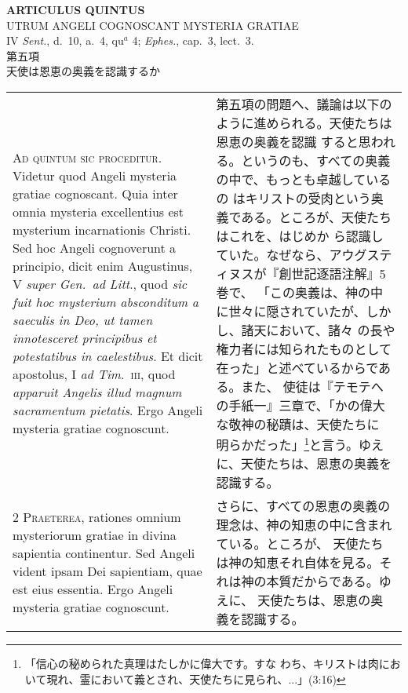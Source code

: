 \documentclass[10pt]{jsarticle} %
\begin{document}
\begin{center}
 {\Large {\bf ARTICULUS QUINTUS}}\\
 {\large UTRUM ANGELI COGNOSCANT MYSTERIA GRATIAE}\\
 {\footnotesize IV {\itshape Sent.}, d.~10, a.~4, qu$^a$ 4; {\itshape
 Ephes.}, cap.~3, lect.~3.}\\
 {\Large 第五項\\天使は恩恵の奥義を認識するか}
\end{center}

\begin{longtable}{p{21em}p{21em}}
{\huge A}{\scshape d quintum sic proceditur}. Videtur quod
Angeli mysteria gratiae cognoscant. Quia inter omnia mysteria
excellentius est mysterium incarnationis Christi. Sed hoc Angeli
cognoverunt a principio, dicit enim Augustinus, V {\itshape super Gen.~ad Litt}.,
quod {\itshape sic fuit hoc mysterium absconditum a saeculis in Deo, ut tamen
innotesceret principibus et potestatibus in caelestibus}. Et dicit
apostolus, I {\itshape ad Tim}.~{\scshape iii}, quod {\itshape apparuit Angelis illud magnum sacramentum
pietatis}. Ergo Angeli mysteria gratiae cognoscunt.

&

第五項の問題へ、議論は以下のように進められる。天使たちは恩恵の奥義を認識
 すると思われる。というのも、すべての奥義の中で、もっとも卓越しているの
 はキリストの受肉という奥義である。ところが、天使たちはこれを、はじめか
 ら認識していた。なぜなら、アウグスティヌスが『創世記逐語注解』5巻で、
 「この奥義は、神の中に世々に隠されていたが、しかし、諸天において、諸々
 の長や権力者には知られたものとして在った」と述べているからである。また、
 使徒は『テモテへの手紙一』三章で、「かの偉大な敬神の秘蹟は、天使たちに
 明らかだった」\footnote{「信心の秘められた真理はたしかに偉大です。すな
 わち、キリストは肉において現れ、霊において義とされ、天使たちに見られ、...」(3:16)}と言う。ゆえに、天使たちは、恩恵の奥義を認識する。


\\


{\scshape 2 Praeterea}, rationes omnium mysteriorum
gratiae in divina sapientia continentur. Sed Angeli vident ipsam Dei
sapientiam, quae est eius essentia. Ergo Angeli mysteria gratiae
cognoscunt.


&

さらに、すべての恩恵の奥義の理念は、神の知恵の中に含まれている。ところが、
 天使たちは神の知恵それ自体を見る。それは神の本質だからである。ゆえに、
 天使たちは、恩恵の奥義を認識する。


\end{longtable}
\end{document}
